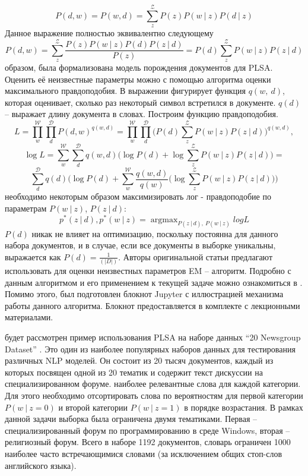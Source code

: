 \documentclass[aps,%
12pt,%
final,%
oneside,
onecolumn,%
musixtex, %
superscriptaddress,%
centertags]{article} %
\DeclareMathOperator*{\argmax}{argmax}
\begin{document}
$$P(d, w) = P(w, d) = \sum_{z}^{\mathcal{Z}} P(z)P(w\ |\ z)P(d\ |\ z)$$
Данное выражение полностью эквивалентно следующему
$$P(d, w) = \sum_{z}^{\mathcal{Z}} \dfrac{P(z)P(w\ |\ z)P(d)P(z\ |\ d)}{P(z)}=P(d)\sum_{z}^{\mathcal{Z}} P(w\ |\ z)P(z\ |\ d)$$
 образом, была формализована модель порождения документов для PLSA. Оценить её неизвестные параметры можно с помощью алгоритма оценки максимального правдоподобия. В выражении фигурирует функция $q(w,\ d)$, которая оценивает, сколько раз некоторый символ встретился в документе. $q(d)$ – выражает длину документа в словах. Построим функцию правдоподобия.
$$L = \prod_{w}^{\mathcal{W}}\prod_{d}^{\mathcal{D}} P(d, w)^{q(w, d)} = \prod_{w}^{\mathcal{W}}\prod_{d}^{\mathcal{D}}\bigg(P(d)\sum_{z}^{\mathcal{Z}} P(w\ |\ z)P(z\ |\ d)\bigg)^{q(w, d)},$$
$$\log L = \sum_{w}^{\mathcal{W}}\sum_{d}^{\mathcal{D}}q(w, d)\bigg(\log P(d) + \log\sum_{z}^{\mathcal{Z}} P(w\ |\ z)P(z\ |\ d) \bigg)=$$
$$\sum_{d}^{\mathcal{D}}q(d)\Bigg(\log P(d) + \sum_{w}^{\mathcal{W}}\frac{q(w, d)}{q(w)}\bigg(\log\sum_{z}^{\mathcal{Z}} P(w\ |\ z)P(z\ |\ d)\bigg)\Bigg)$$
 необходимо некоторым образом максимизировать лог - правдоподобие по параметрам $P(w\ |\ z)$, $P(z\ |\ d)$: $$p^*(z\ |\ d), p^*(w\ |\ z) = \argmax_{P(z\ |\ d),\ P(w\ |\ z)} log L$$ 
 $P(d)$ никак не влияет на оптимизацию, поскольку постоянна для данного набора документов, и в случае, если все документы в выборке уникальны, выражается как $P(d)=\frac{1}{(|D|)}$.  Авторы оригинальной статьи предлагают использовать для оценки неизвестных параметров EM – алгоритм. Подробно с данным алгоритмом и его применением к текущей задаче можно ознакомиться в \cite{hoffman1}. Помимо этого, был подготовлен блокнот Jupyter с иллюстрацией механизма работы данного алгоритма. Блокнот предоставляется в комплекте с лекционными материалами.

 будет рассмотрен пример использования PLSA на наборе данных “20 Newsgroup Dataset” . Это один из наиболее популярных наборов данных для тестирования различных NLP моделей. Он состоит из 20 тысяч документов, каждый из которых посвящен одной из 20 тематик и содержит текст дискуссии на специализированном форуме.
 наиболее релевантные слова для каждой категории. Для этого необходимо отсортировать слова по вероятностям для первой категории $P(w\ |\ z=0)$ и второй категории $P(w\ |\  z=1)$ в порядке возрастания. В рамках данной задачи выборка была ограничена двумя тематиками. Первая – специализированный форум по программированию в среде Windows, вторая – религиозный форум. Всего в наборе 1192 документов, словарь ограничен 1000 наиболее часто встречающимися словами (за исключением общих стоп-слов английского языка).
\end{document}
